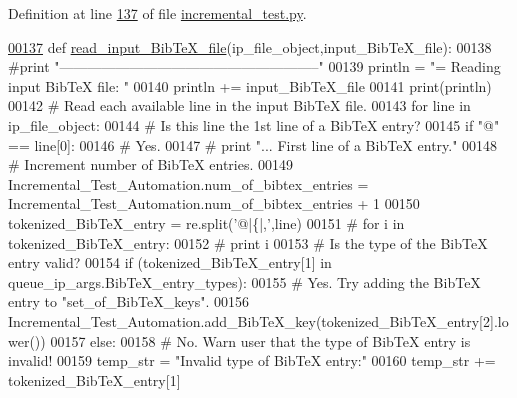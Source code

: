 Definition at line \hyperlink{incremental__test_8py_source_l00137}{137} of file \hyperlink{incremental__test_8py_source}{incremental\+\_\+test.\+py}.


\begin{DoxyCode}
\hypertarget{classincremental__test_1_1Incremental__Test__Automation_l00137}{}\hyperlink{classincremental__test_1_1Incremental__Test__Automation_a7cec6a541c4680c857a699dbe363ffbd}{00137}     \textcolor{keyword}{def }\hyperlink{classincremental__test_1_1Incremental__Test__Automation_a7cec6a541c4680c857a699dbe363ffbd}{read\_input\_BibTeX\_file}(ip\_file\_object,input\_BibTeX\_file):
00138         \textcolor{comment}{#print "--------------------------------------------------------"}
00139         println = \textcolor{stringliteral}{"=    Reading input BibTeX file: "}
00140         println += input\_BibTeX\_file
00141         print(println)
00142         \textcolor{comment}{# Read each available line in the input BibTeX file.}
00143         \textcolor{keywordflow}{for} line \textcolor{keywordflow}{in} ip\_file\_object:
00144             \textcolor{comment}{# Is this line the 1st line of a BibTeX entry?}
00145             \textcolor{keywordflow}{if} \textcolor{stringliteral}{"@"} == line[0]:
00146                 \textcolor{comment}{# Yes.}
00147 \textcolor{comment}{#               print "...  First line of a BibTeX entry."}
00148                 \textcolor{comment}{# Increment number of BibTeX entries.}
00149                 Incremental\_Test\_Automation.num\_of\_bibtex\_entries = 
      Incremental\_Test\_Automation.num\_of\_bibtex\_entries + 1
00150                 tokenized\_BibTeX\_entry = re.split(\textcolor{stringliteral}{'@|\{|,'},line)
00151 \textcolor{comment}{#               for i in tokenized\_BibTeX\_entry:}
00152 \textcolor{comment}{#                   print i}
00153                 \textcolor{comment}{# Is the type of the BibTeX entry valid?}
00154                 \textcolor{keywordflow}{if} (tokenized\_BibTeX\_entry[1] \textcolor{keywordflow}{in} queue\_ip\_args.BibTeX\_entry\_types):
00155                     \textcolor{comment}{# Yes. Try adding the BibTeX entry to "set\_of\_BibTeX\_keys".}
00156                     Incremental\_Test\_Automation.add\_BibTeX\_key(tokenized\_BibTeX\_entry[2].lower())
00157                 \textcolor{keywordflow}{else}:
00158                     \textcolor{comment}{# No. Warn user that the type of BibTeX entry is invalid!}
00159                     temp\_str = \textcolor{stringliteral}{"Invalid type of BibTeX entry:"}
00160                     temp\_str += tokenized\_BibTeX\_entry[1]

\end{DoxyCode}

